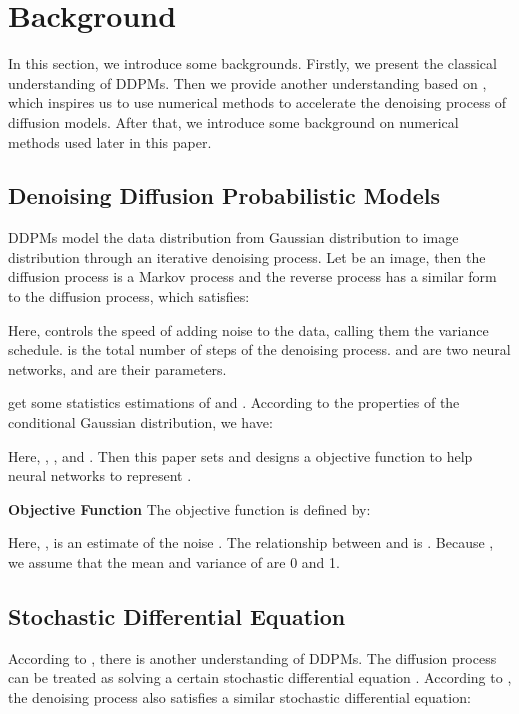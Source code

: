 \documentclass{article}
\begin{document}
\section{Background}
\label{background}

In this section, we introduce some backgrounds. Firstly, we present the classical understanding of DDPMs. Then we provide another understanding based on \citet{Song2020}, which inspires us to use numerical methods to accelerate the denoising process of diffusion models. After that, we introduce some background on numerical methods used later in this paper.

\subsection{Denoising Diffusion Probabilistic Models}

DDPMs model the data distribution from Gaussian distribution to image distribution through an iterative denoising process. Let  be an image, then the diffusion process is a Markov process and the reverse process has a similar form to the diffusion process, which satisfies:

Here,  controls the speed of adding noise to the data, calling them the variance schedule.  is the total number of steps of the denoising process.  and  are two neural networks, and  are their parameters.


\citet{Ho2020} get some statistics estimations of  and . According to the properties of the conditional Gaussian distribution, we have:

Here, , ,  and .  Then this paper sets  and designs a objective function to help neural networks to represent .

\textbf{Objective Function} The objective function is defined by: 

Here, ,  is an estimate of the noise . The relationship between  and  is . Because , we assume that the mean and variance of  are 0 and 1.



\subsection{Stochastic Differential Equation}
According to \citet{Song2020}, there is another understanding of DDPMs. The diffusion process can be treated as solving a certain stochastic differential equation . According to \citet{Anderson1982}, the denoising process also satisfies a similar stochastic differential equation:
\end{document}
